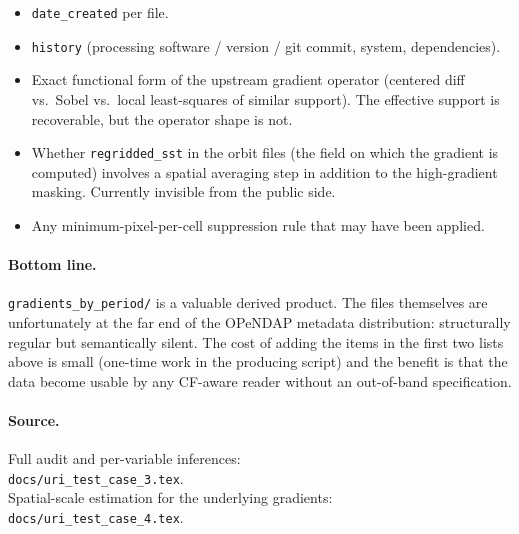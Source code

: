 \documentclass[11pt]{article}
\begin{document}
\begin{itemize}[leftmargin=*,topsep=2pt]
  \item \texttt{date\_created} per file.
  \item \texttt{history} (processing software / version / git
    commit, system, dependencies).
  \item Exact functional form of the upstream gradient operator
    (centered diff vs.\ Sobel vs.\ local least-squares of similar
    support). The effective support is recoverable, but the
    operator shape is not.
  \item Whether \texttt{regridded\_sst} in the orbit files (the
    field on which the gradient is computed) involves a spatial
    averaging step in addition to the high-gradient masking.
    Currently invisible from the public side.
  \item Any minimum-pixel-per-cell suppression rule that may have
    been applied.
\end{itemize}

\paragraph{Bottom line.}
\texttt{gradients\_by\_period/} is a valuable derived product. The
files themselves are unfortunately at the far end of the OPeNDAP
metadata distribution: structurally regular but semantically
silent. The cost of adding the items in the first two lists above
is small (one-time work in the producing script) and the benefit
is that the data become usable by any CF-aware reader without an
out-of-band specification.

\paragraph{Source.}
Full audit and per-variable inferences: \\
\texttt{docs/uri\_test\_case\_3.tex}. \\
Spatial-scale estimation for the underlying gradients: \\
\texttt{docs/uri\_test\_case\_4.tex}.
\end{document}
